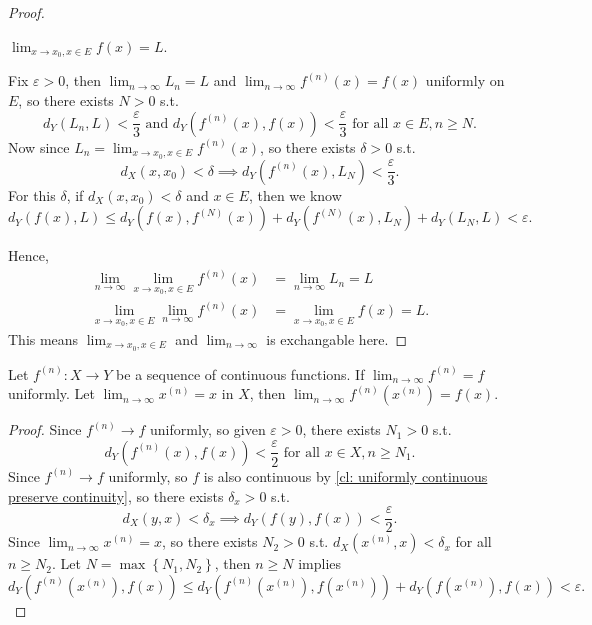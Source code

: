 \begin{proof}
    \begin{claim}
        \(\lim_{x \to x_0, x \in E} f(x) = L\). 
    \end{claim}    
    \begin{explanation}
        Fix \(\varepsilon > 0\), then \(\lim_{n \to \infty} L_n = L \) and \(\lim_{n \to \infty} f^{(n)}(x) = f(x) \) uniformly on \(E\), so there exists \(N > 0\) s.t. 
        \[
            d_Y \left( L_n, L \right) < \frac{\varepsilon}{3} \text{ and } d_Y \left( f^{(n)}(x), f(x) \right) < \frac{\varepsilon}{3} \text{ for all } x \in E, n \ge N.  
        \] 
        Now since \(L_n = \lim_{x \to x_0, x \in E} f^{(n)}(x)\), so there exists \(\delta > 0\) s.t. 
        \[
            d_X(x, x_0) < \delta \implies d_Y \left( f^{(n)}(x), L_N \right) < \frac{\varepsilon}{3}.
        \]  
        For this \(\delta \), if \(d_X(x, x_0) < \delta \) and \(x \in E\), then we know 
        \[
            d_Y (f(x), L) \le d_Y \left( f(x), f^{(N)}(x) \right) + d_Y \left( f^{(N)}(x), L_N \right) + d_Y \left( L_N, L \right) < \varepsilon.  
        \]     
    \end{explanation} 
    Hence, 
    \begin{align*}
        \lim_{n \to \infty} \lim_{x \to x_0, x \in E} f^{(n)}(x) &= \lim_{n \to \infty} L_n = L \\
        \lim_{x \to x_0, x \in E} \lim_{n \to \infty} f^{(n)}(x) &= \lim_{x \to x_0, x \in E} f(x) = L. 
    \end{align*}  
    This means \(\lim_{x \to x_0, x \in E}\) and \(\lim_{n \to \infty} \) is exchangable here.
\end{proof}

\begin{proposition}
    Let \(f^{(n)}:X \to Y\) be a sequence of continuous functions. If \(\lim_{n \to \infty} f^{(n)} = f \) uniformly. Let \(\lim_{n \to \infty} x^{(n)} = x \) in \(X\), then \(\lim_{n \to \infty} f^{(n)}\left( x^{(n)} \right) = f(x)  \).     
\end{proposition}
\begin{proof}
    Since \(f^{(n)} \to  f\) uniformly, so given \(\varepsilon > 0\), there exists \(N_1 > 0\) s.t. 
    \[
        d_Y \left( f^{(n)}(x), f(x) \right) < \frac{\varepsilon}{2} \text{ for all } x \in X, n \ge N_1.  
    \]  
    Since \(f^{(n)} \to f\) uniformly, so \(f\) is also continuous by \autoref{cl: uniformly continuous preserve continuity}, so there exists \(\delta _x > 0\) s.t. 
    \[
        d_X(y, x) < \delta _x \implies d_Y \left( f(y), f(x) \right) < \frac{\varepsilon}{2}. 
    \]     
    Since \(\lim_{n \to \infty} x^{(n)} = x \), so there exists \(N_2 > 0\) s.t. \(d_X \left( x^{(n)}, x \right) < \delta _x \) for all \(n \ge N_2\). Let \(N = \max \left\{ N_1, N_2 \right\} \), then \(n \ge N\) implies 
    \[
        d_Y \left( f^{(n)}\left( x^{(n)} \right), f(x)  \right) \le d_Y \left( f^{(n)} \left( x^{(n)} \right), f \left( x^{(n)} \right)   \right) + d_Y \left( f \left( x^{(n)} \right), f(x)  \right) < \varepsilon .  
    \]     
\end{proof}


